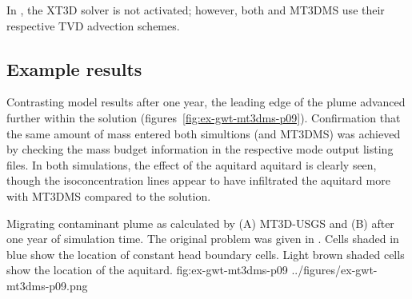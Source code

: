 

In \mf, the XT3D solver is not activated; however, both \mf and MT3DMS use their respective TVD advection schemes.  

\subsection{Example results}

Contrasting model results after one year, the leading edge of the plume advanced further within the \mf solution (figures~\ref{fig:ex-gwt-mt3dms-p09}). Confirmation that the same amount of mass entered both simultions (\mf and MT3DMS) was achieved by checking the mass budget information in the respective mode output listing files. In both simulations, the effect of the aquitard aquitard is clearly seen, though the isoconcentration lines appear to have infiltrated the aquitard more with MT3DMS compared to the \mf solution.  

\begin{StandardFigure}
	{Migrating contaminant plume as calculated by (A) MT3D-USGS and (B) \mf after one year of simulation time.  The original problem was given in \citep{zheng1999mt3dms}.  Cells shaded in blue show the location of constant head boundary cells.  Light brown shaded cells show the location of the aquitard.} 
	{fig:ex-gwt-mt3dms-p09}
	{../figures/ex-gwt-mt3dms-p09.png}
\end{StandardFigure}
